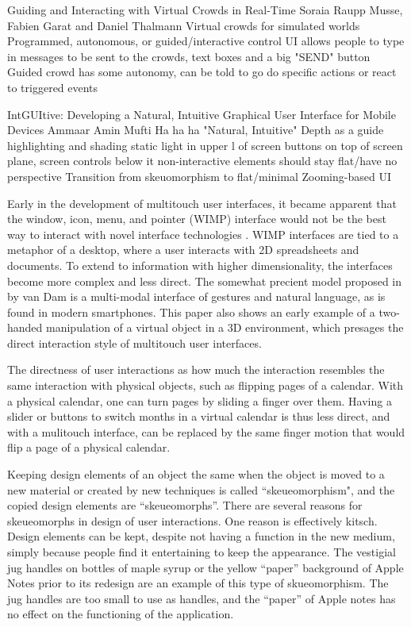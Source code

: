 	
\citep{musse1999guiding}		
Guiding and Interacting with Virtual Crowds in Real-Time
Soraia Raupp Musse, Fabien Garat and Daniel Thalmann
	Virtual crowds for simulated worlds
	Programmed, autonomous, or guided/interactive control
	UI allows people to type in messages to be sent to the crowds, text boxes and a big "SEND" button
	Guided crowd has some autonomy, can be told to go do specific actions or react to triggered events

\citep{mufti2017intguitive}
IntGUItive: Developing a Natural, Intuitive Graphical User Interface for Mobile Devices
Ammaar Amin Mufti
	Ha ha ha "Natural, Intuitive"
	Depth as a guide
		highlighting and shading
		static light in upper l of screen
		buttons on top of screen plane, screen controls below it
		non-interactive elements should stay flat/have no perspective
	Transition from skeuomorphism to flat/minimal
	Zooming-based UI


Early in the development of multitouch user interfaces, it became apparent that the window, icon, menu, and pointer (WIMP) interface would not be the best way to interact with novel interface technologies \citep{van1997post}. 
WIMP interfaces are tied to a metaphor of a desktop, where a user interacts with 2D spreadsheets and documents. 
To extend to information with higher dimensionality, the interfaces become more complex and less direct. 
The somewhat precient model proposed in by van Dam is a multi-modal interface of gestures and natural language, as is found in modern smartphones. 
This paper also shows an early example of a two-handed manipulation of a virtual object in a 3D environment, which presages the direct interaction style of multitouch user interfaces. 

The directness of user interactions as how much the interaction resembles the same interaction with physical objects, such as flipping pages of a calendar. 
With a physical calendar, one can turn pages by sliding a finger over them. 
Having a slider or buttons to switch months in a virtual calendar is thus less direct, and with a mulitouch interface, can be replaced by the same finger motion that would flip a page of a physical calendar. 

Keeping design elements of an object the same when the object is moved to a new material or created by new techniques is called ``skeueomorphism", and the copied design elements are ``skeueomorphs''. 
There are several reasons for skeueomorphs in design of user interactions. 
One reason is effectively kitsch. 
Design elements can be kept, despite not having a function in the new medium, simply because people find it entertaining to keep the appearance.
The vestigial jug handles on bottles of maple syrup or the yellow ``paper'' background of Apple Notes prior to its redesign are an example of this type of skueomorphism.
The jug handles are too small to use as handles, and the ``paper'' of Apple notes has no effect on the functioning of the application. 

